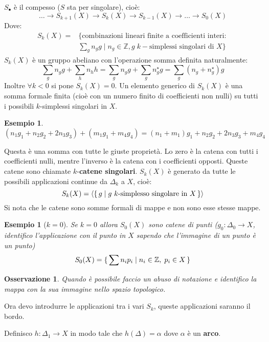 \documentclass[10pt, twoside=false, x11names]{scrbook}
\newtheorem{osservation}[theorem]{Osservazione}
\newtheorem{example}[theorem]{Esempio}
\newcommand{\Z}{\mathbb{Z}}
\begin{document}
$ S_\bullet $ è il compesso ($ S $ sta per singolare), cioè:
\[
  \dots \to S_{k+1}(X) \to S_k(X) \to S_{k-1}(X) \to \dots \to S_0(X)
\]
Dove:
\begin{align*}
  S_k(X) ={}& \{\text{combinazioni lineari finite a coefficienti interi: } \\
            & \sum_g n_g g \;|\; n_g \in \Z, g \; k-\text{simplessi singolari di } X \}
\end{align*}
$ S_k(X) $ è un gruppo abeliano con l'operazione somma definita naturalmente:
\[
  \sum_g n_g g + \sum_h n_h h =   \sum_g n_g g + \sum_g n_g^\star g = \sum_g (n_g + n_g^\star)g
\]
Inoltre $ \forall k < 0 $ si pone $ S_k(X) = 0 $. Un elemento generico di $ S_k(X) $
è una somma formale finita (cioè con un numero finito di coefficienti non nulli)
su tutti i possibili $ k $-simplessi singolari in $ X $.
\begin{example}
  \[
    (n_1 g_1 + n_2 g_2 + 2 n_3 g_3) + (m_1 g_1 + m_4 g_4) = (n_1 + m_1)g_1 + n_2 g_2 + 2 n_3 g_3 + m_4 g_4
  \]
\end{example}
Questa è una somma con tutte le giuste proprietà. Lo zero è la catena con tutti i coefficienti nulli,
mentre l'inverso è la catena con i coefficienti opposti.
Queste catene sono chiamate $ k $-\textbf{catene singolari}.
$ S_k(X) $ è generato da tutte le possibili applicazioni continue da $ \Delta_k $ a $ X $, cioè:
\[
  S_k(X) = \langle \set{g | g \text{ $ k $-simplesso singolare in $ X $}} \rangle
\]
Si nota che le catene sono somme formali di mappe e non sono esse stesse mappe.
\begin{example}[$ k = 0$]
  Se $ k = 0 $ allora $ S_0(X) $ sono catene di punti ($ g_0 : \Delta_0 \to X $, identifico l'applicazione
  con il punto in $ X $ sapendo che l'immagine di un punto è un punto)
  \[
    S_0(X) = \set { \sum n_i p_i | n_i \in \Z, \; p_i \in X}
  \]
\end{example}
\begin{osservation}
  Quando è possibile faccio un abuso di notazione e identifico la mappa con la sua immagine
  nello spazio topologico.
\end{osservation}

Ora devo introdurre le applicazioni tra i vari $ S_k $, queste applicazioni saranno il bordo.

Definisco $ h: \Delta_1 \to X $ in modo tale che $ h(\Delta) = \alpha $ dove $ \alpha $ è un \textbf{arco}.
\end{document}
